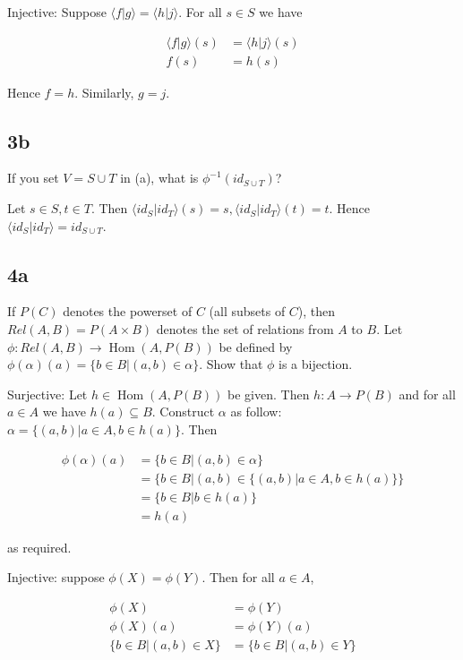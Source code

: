 \documentclass{article}
\DeclareMathOperator{\Hom}{Hom}
\newcommand{\<}{\langle}
\renewcommand{\>}{\rangle}
\begin{document}
Injective: Suppose $\<f|g\> = \<h|j\>$. For all $s \in S$ we have

\begin{align*}
\<f|g\>(s) &= \<h|j\>(s) \\
f(s) &= h(s)
\end{align*}

Hence $f = h$. Similarly, $g = j$.

\subsection*{3b}

If you set $V = S \cup T$ in (a), what is $\phi^{-1}(id_{S \cup T})$?

Let $s \in S, t \in T$. Then $\<id_S | id_T\>(s) = s, \<id_S | id_T\>(t) = t$. Hence $\<id_S | id_T\> = id_{S \cup T}$.

\subsection*{4a}

If $P(C)$ denotes the powerset of $C$ (all subsets of $C$), then $Rel(A, B) = P(A \times B)$ denotes the set of relations from $A$ to $B$. Let $\phi: Rel(A, B) \to \Hom(A, P(B))$ be defined by $\phi(\alpha)(a) = \{b \in B | (a, b) \in \alpha \}$. Show that $\phi$ is a bijection.

Surjective: Let $h \in \Hom(A, P(B))$ be given. Then $h: A \to P(B)$ and for all $a \in A$ we have $h(a) \subseteq B$. Construct $\alpha$ as follow: $\alpha = \{(a, b) | a \in A, b \in h(a) \}$. Then

\begin{align*}
\phi(\alpha)(a) &= \{b \in B | (a, b) \in \alpha \} \\
&= \{b \in B | (a, b) \in \{(a, b) | a \in A, b \in h(a) \} \} \\
&= \{b \in B | b \in h(a) \} \\
&= h(a)
\end{align*}

as required.

Injective: suppose $\phi(X) = \phi(Y)$. Then for all $a \in A$,

\begin{align*}
\phi(X) &= \phi(Y) \\
\phi(X)(a) &= \phi(Y)(a) \\
\{b \in B | (a, b) \in X\} &= \{b \in B | (a, b) \in Y\}
\end{align*}
\end{document}
